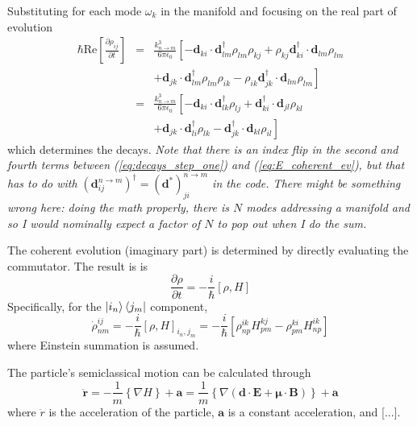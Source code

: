 \documentclass[final,5p,times,twocolumn]{elsarticle}
\newcounter{bla}
\begin{document}
Substituting for each mode $\omega_k$ in the manifold and focusing on the real part of evolution
\begin{eqnarray}
	\hbar\text{Re}\left[\frac{\partial \rho_{ij}}{\partial t}\right] & = &  \frac{k_{n\rightarrow m}^3}{6\pi\epsilon_0}\left[
	-\mathbf{d}_{ki}\cdot \mathbf{d}^\dagger_{lm}\rho_{lm}\rho_{kj} 
	+\rho_{kj}\mathbf{d}_{ki}^\dagger \cdot \mathbf{d}_{lm}\rho_{lm}  \right. \nonumber \label{eq:decays_step_one} \\
	& & \left. + \mathbf{d}_{jk}\cdot \mathbf{d}^\dagger_{lm}\rho_{lm}\rho_{ik}
	- \rho_{ik}\mathbf{d}_{jk}^\dagger \cdot \mathbf{d}_{lm}\rho_{lm}
	\right] \\
	& = & \frac{k_{n\rightarrow m}^3}{6\pi\epsilon_0 }\left[
	-\mathbf{d}_{ki}\cdot \mathbf{d}^\dagger_{lk}\rho_{lj} 
	+ \mathbf{d}_{ki}^\dagger \cdot \mathbf{d}_{jl}\rho_{kl} \right. \nonumber \\
	& & \left. + \mathbf{d}_{jk}\cdot \mathbf{d}^\dagger_{li}\rho_{lk}
	- \mathbf{d}_{jk}^\dagger \cdot \mathbf{d}_{kl}\rho_{il} \right] \label{eq:decay}
\end{eqnarray}
which determines the decays.   {\it Note that there is an index flip in the second and fourth terms between (\ref{eq:decays_step_one}) and (\ref{eq:E_coherent_ev}), but that has to do with $(\mathbf{d}^{n\rightarrow m}_{ij})^\dagger = (\mathbf{d}^*)^{n\rightarrow m}_{ji}$ in the code.  There might be something wrong here: doing the math properly, there is $N$ modes addressing a manifold and so I would nominally expect a factor of $N$ to pop out when I do the sum.}

The coherent evolution (imaginary part) is determined by directly evaluating the commutator. The result is is
\begin{equation}
	\frac{\partial \rho}{\partial t} = -\frac{i}{\hbar}[\rho, H]
\end{equation}
Specifically, for the $\ket{i_n}\Bra{j_m}$ component,
\begin{equation}
	\dot{\rho}^{ij}_{nm} = -\frac{i}{\hbar}[\rho, H]_{i_n, j_m} = -\frac{i}{\hbar}\left[\rho^{ik}_{np}H^{kj}_{pm} - \rho^{ki}_{pm}H^{ik}_{np}\right]
\end{equation}
where Einstein summation is assumed.

The particle's semiclassical motion can be calculated through
\begin{equation}
	\ddot{\mathbf{r}} = -\frac{1}{m} \left\{\nabla H\right\} + \mathbf{a} = \frac{1}{m}\left\{\nabla (\mathbf{d} \cdot \mathbf{E} + \mathbf{\mu}\cdot \mathbf{B})\right\} + \mathbf{a}
\end{equation}
where $\ddot{r}$ is the acceleration of the particle, $\mathbf{a}$ is a constant acceleration, and [...].
\end{document}
